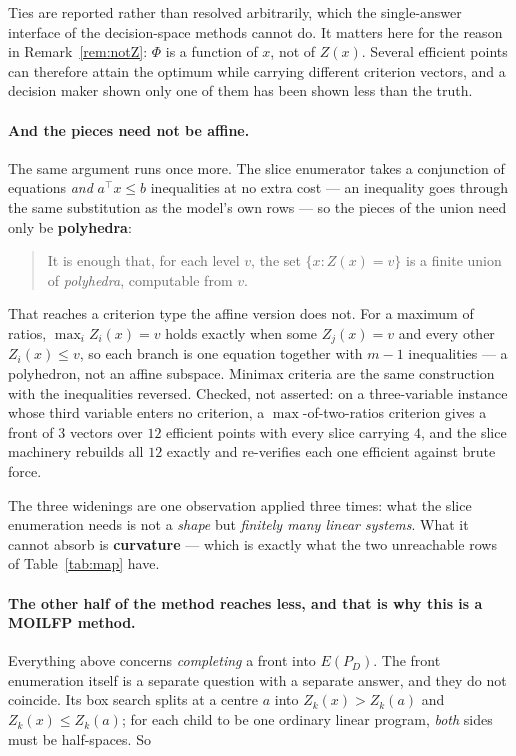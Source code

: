 \documentclass[11pt,a4paper]{article}
\newcommand{\Z}{Z}
\newcommand{\Dset}{D}
\newcommand{\E}{E(P_{\Dset})}
\begin{document}
Ties are reported rather than resolved arbitrarily, which the single-answer
interface of the decision-space methods cannot do.  It matters here for the
reason in Remark~\ref{rem:notZ}: $\Phi$ is a function of $x$, not of $\Z(x)$.
Several efficient points can therefore attain the optimum while carrying
different criterion vectors, and a decision maker shown only one of them has
been shown less than the truth.

\paragraph{And the pieces need not be affine.}
The same argument runs once more.  The slice enumerator takes a conjunction of
equations \emph{and} $a^{\top}x \leqslant b$ inequalities at no extra cost ---
an inequality goes through the same substitution as the model's own rows --- so
the pieces of the union need only be \textbf{polyhedra}:

\begin{quote}
It is enough that, for each level $v$, the set $\{x : Z(x) = v\}$ is a finite
union of \emph{polyhedra}, computable from $v$.
\end{quote}

\noindent
That reaches a criterion type the affine version does not.  For a maximum of
ratios, $\max_i Z_i(x) = v$ holds exactly when some $Z_j(x) = v$ and every
other $Z_i(x) \leqslant v$, so each branch is one equation together with $m-1$
inequalities --- a polyhedron, not an affine subspace.  Minimax criteria are
the same construction with the inequalities reversed.  Checked, not asserted:
on a three-variable instance whose third variable enters no criterion, a
$\max$-of-two-ratios criterion gives a front of $3$ vectors over $12$ efficient
points with every slice carrying $4$, and the slice machinery rebuilds all $12$
exactly and re-verifies each one efficient against brute force.

The three widenings are one observation applied three times: what the slice
enumeration needs is not a \emph{shape} but \emph{finitely many linear
systems}.  What it cannot absorb is \textbf{curvature} --- which is exactly
what the two unreachable rows of Table~\ref{tab:map} have.

\paragraph{The other half of the method reaches less, and that is why this is a
MOILFP method.}
Everything above concerns \emph{completing} a front into $\E$.  The front
enumeration itself is a separate question with a separate answer, and they do
not coincide.  Its box search splits at a centre $a$ into $Z_k(x) > Z_k(a)$ and
$Z_k(x) \leqslant Z_k(a)$; for each child to be one ordinary linear program,
\emph{both} sides must be half-spaces.  So
\end{document}
